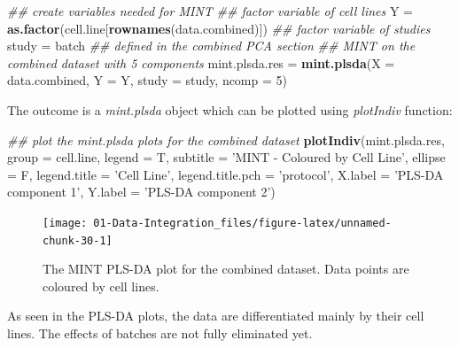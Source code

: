 \documentclass[]{book}
\newenvironment{Shaded}{\begin{snugshade}}{\end{snugshade}}
\newcommand{\CommentTok}[1]{\textcolor[rgb]{0.56,0.35,0.01}{\textit{#1}}}
\newcommand{\DataTypeTok}[1]{\textcolor[rgb]{0.13,0.29,0.53}{#1}}
\newcommand{\DecValTok}[1]{\textcolor[rgb]{0.00,0.00,0.81}{#1}}
\newcommand{\KeywordTok}[1]{\textcolor[rgb]{0.13,0.29,0.53}{\textbf{#1}}}
\newcommand{\NormalTok}[1]{#1}
\newcommand{\StringTok}[1]{\textcolor[rgb]{0.31,0.60,0.02}{#1}}
\theoremstyle{definition}
\theoremstyle{definition}
\theoremstyle{definition}
\theoremstyle{remark}
\begin{document}
\begin{Shaded}
\begin{Highlighting}[]
\CommentTok{## create variables needed for MINT}
\CommentTok{## factor variable of cell lines}
\NormalTok{Y =}\StringTok{ }\KeywordTok{as.factor}\NormalTok{(cell.line[}\KeywordTok{rownames}\NormalTok{(data.combined)])}
\CommentTok{## factor variable of studies}
\NormalTok{study =}\StringTok{ }\NormalTok{batch }\CommentTok{## defined in the combined PCA section}
\CommentTok{## MINT on the combined dataset with 5 components}
\NormalTok{mint.plsda.res =}\StringTok{ }\KeywordTok{mint.plsda}\NormalTok{(}\DataTypeTok{X =}\NormalTok{ data.combined, }\DataTypeTok{Y =}\NormalTok{ Y,}
                             \DataTypeTok{study =}\NormalTok{ study, }\DataTypeTok{ncomp =} \DecValTok{5}\NormalTok{)}
\end{Highlighting}
\end{Shaded}

The outcome is a \emph{mint.plsda} object which can be plotted using
\emph{plotIndiv} function:

\begin{Shaded}
\begin{Highlighting}[]
\CommentTok{## plot the mint.plsda plots for the combined dataset}
\KeywordTok{plotIndiv}\NormalTok{(mint.plsda.res, }\DataTypeTok{group =}\NormalTok{ cell.line,}
          \DataTypeTok{legend  =}\NormalTok{ T, }\DataTypeTok{subtitle     =} \StringTok{'MINT - Coloured by Cell Line'}\NormalTok{,}
          \DataTypeTok{ellipse =}\NormalTok{ F, }\DataTypeTok{legend.title =} \StringTok{'Cell Line'}\NormalTok{,}
          \DataTypeTok{legend.title.pch =} \StringTok{'protocol'}\NormalTok{,}
          \DataTypeTok{X.label =} \StringTok{'PLS-DA component 1'}\NormalTok{,}
          \DataTypeTok{Y.label =} \StringTok{'PLS-DA component 2'}\NormalTok{)}
\end{Highlighting}
\end{Shaded}

\begin{figure}[ht]

{\centering \texttt{[image: 01-Data-Integration\_files/figure-latex/unnamed-chunk-30-1]} 

}

\caption{The MINT PLS-DA plot for the combined dataset. Data points are coloured by cell lines.}\label{fig:unnamed-chunk-30}
\end{figure}

As seen in the PLS-DA plots, the data are differentiated mainly by their
cell lines. The effects of batches are not fully eliminated yet.
\end{document}
